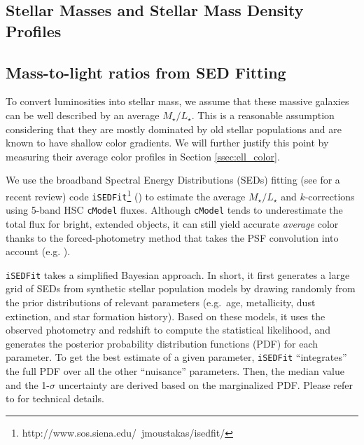 \documentclass{emulateapj}
\def\cmodel{\texttt{cModel}}
\def\m2l{{$M_{\star}/L_{\star}$}}
\begin{document}
\begin{CJK*}{UTF8}{gbsn}
\section{Stellar Masses and Stellar Mass Density Profiles}
    \label{sec:mstar}

\subsection{Mass-to-light ratios from SED Fitting}
    \label{ssec:isedfit}
   
    To convert luminosities into stellar mass, we assume that these massive galaxies 
    can be well described by an average \m2l{}. 
    This is a reasonable assumption considering that they are mostly dominated by 
    old stellar populations and are known to have shallow color gradients. 
    We will further justify this point by measuring their average color profiles in 
    Section \ref{ssec:ell_color}.

    We use the broadband Spectral Energy Distributions (SEDs) fitting 
    (see \citealt{Walcher2011} for a recent review) code 
    \texttt{iSEDFit}\footnote{http://www.sos.siena.edu/~jmoustakas/isedfit/} 
    (\citealt{Moustakas13}) to estimate the average \m2l{} and $k$-corrections using
    5-band HSC \cmodel{} fluxes. 
    Although \cmodel{} tends to underestimate the total flux for bright, extended 
    objects, it can still yield accurate \emph{average} color thanks to the 
    forced-photometry method that takes the PSF convolution into account
    (e.g. \citealt{SynPipeInPrep}). 

    \texttt{iSEDFit} takes a simplified Bayesian approach. 
    In short, it first generates a large grid of SEDs from synthetic stellar population 
    models by drawing randomly from the prior distributions of relevant parameters 
    (e.g.\ age, metallicity, dust extinction, and star formation history).
    Based on these models, it uses the observed photometry and redshift to compute the 
    statistical likelihood, and generates the posterior probability distribution 
    functions (PDF) for each parameter.  
    To get the best estimate of a given parameter, \texttt{iSEDFit} ``integrates'' the 
    full PDF over all the other ``nuisance'' parameters.
    Then, the median value and the 1-$\sigma$ uncertainty are derived based on the 
    marginalized PDF. 
    Please refer to \citet{Moustakas13} for technical details. 
    

\end{CJK*}
\end{document}
